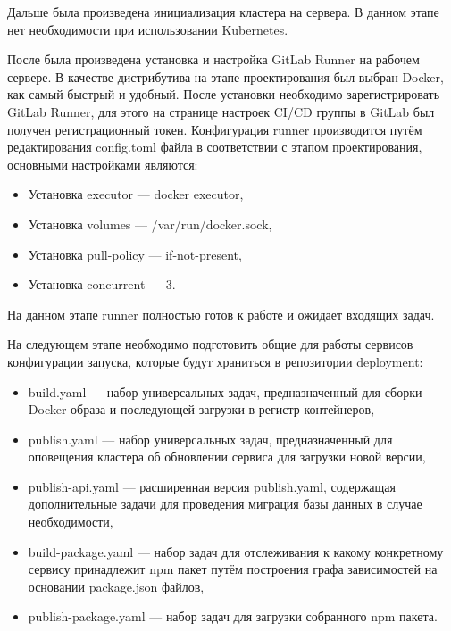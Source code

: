 Дальше была произведена инициализация кластера на сервера.
В данном этапе нет необходимости при использовании Kubernetes.

После была произведена установка и настройка GitLab Runner на рабочем сервере.
В качестве дистрибутива на этапе проектирования был выбран Docker, как самый быстрый и удобный.
После установки необходимо зарегистрировать GitLab Runner, для этого на странице настроек CI/CD группы в GitLab был получен регистрационный токен.
Конфигурация runner производится путём редактирования config.toml файла в соответствии с этапом проектирования, основными настройками являются:

\begin{itemize}
    \item Установка executor --- docker executor,
    \item Установка volumes --- /var/run/docker.sock,
    \item Установка pull-policy --- if-not-present,
    \item Установка concurrent --- 3.
\end{itemize}

На данном этапе runner полностью готов к работе и ожидает входящих задач.

На следующем этапе необходимо подготовить общие для работы сервисов конфигурации запуска, которые будут храниться в репозитории deployment:

\begin{itemize}
    \item build.yaml --- набор универсальных задач, предназначенный для сборки Docker образа и последующей загрузки в  регистр контейнеров,
    \item publish.yaml --- набор универсальных задач, предназначенный для оповещения кластера об обновлении сервиса для загрузки новой версии,
    \item publish-api.yaml --- расширенная версия publish.yaml, содержащая дополнительные задачи для проведения миграция базы данных в случае необходимости,
    \item build-package.yaml --- набор задач для отслеживания к какому конкретному сервису принадлежит npm пакет путём построения графа зависимостей на основании package.json файлов,
    \item publish-package.yaml --- набор задач для загрузки собранного npm пакета.
\end{itemize}

